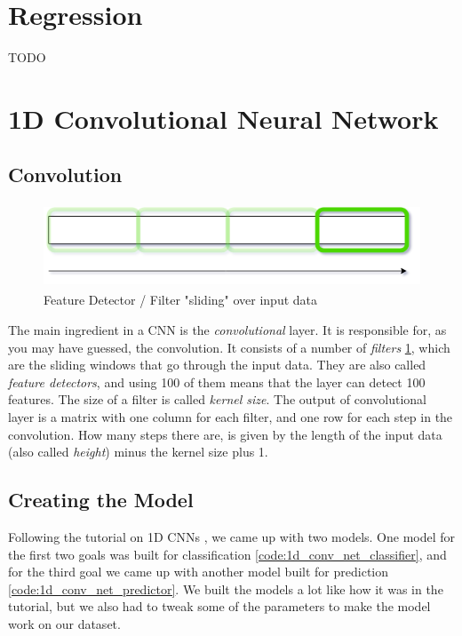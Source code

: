 \section{Regression}

TODO

\section{1D Convolutional Neural Network}

\subsection{Convolution}
\begin{figure}
    \includegraphics[height=2.5cm]{img/feature_detector.png}
    \caption{Feature Detector / Filter "sliding" over input data}
    \label{figure:feature_detector}
\end{figure}

The main ingredient in a CNN is the \textit{convolutional} layer. It is responsible for, as you may have guessed, the convolution.
It consists of a number of \textit{filters} \ref{figure:feature_detector}, which are the sliding windows that go through the input data. 
They are also called \textit{feature detectors}, and using 100 of them means that the layer can detect 100 features. 
The size of a filter is called \textit{kernel size}. The output of convolutional layer is a matrix with one column for each filter, and one row for each step
in the convolution. How many steps there are, is given by the length of the input data (also called \textit{height}) minus the kernel size plus 1.


\subsection{Creating the Model}
Following the tutorial on 1D CNNs \cite{1d_cnn}, we came up with two models. 
One model for the first two goals was built for classification \ref{code:1d_conv_net_classifier}, and for the third goal we came up with another model built for 
prediction \ref{code:1d_conv_net_predictor}. We built the models a lot like how it was in the tutorial, 
but we also had to tweak some of the parameters to make the model work on our dataset.

